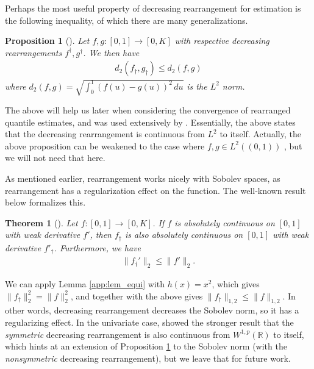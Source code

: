 \documentclass[11pt,a4paper]{article}
\newtheorem{thm}{Theorem}
\newtheorem{prop}{Proposition}
\newcommand{\R}{\mathbb{R}}
\begin{document}
\begin{appendices}
Perhaps the most useful property of decreasing rearrangement for estimation is the following inequality, of which there are many generalizations.
\begin{prop}[{\cite[Theorem 4.19]{Leoni2017}}]\label{app:prop_L2}
Let $f,g: [0,1] \to [0,K]$ with respective decreasing rearrangements $f^{\dagger},g^{\dagger}$. We then have 
\begin{align*}
  d_2(f_{\dagger}, g_{\dagger}) \leq d_2(f,g)
\end{align*}
where $d_2(f,g) = \sqrt{\int_0^1 (f(u) - g(u))^2\, du}$ is the $L^2$ norm.
\end{prop}
The above will help us later when considering the convergence of rearranged quantile estimates, and was used extensively by \citet{Chernozhukov2010}. Essentially, the above states that the decreasing rearrangement is continuous from $L^2$ to itself. Actually, the above proposition can be weakened to the case where $f,g \in L^2((0,1))$ \cite[Theorem 1.2.3]{Kesavan2006}, but we will not need that here.

As mentioned earlier, rearrangement works nicely with Sobolev spaces, as rearrangement has a regularization effect on the function. The well-known result below formalizes this.
\begin{thm}[{\cite[Theorem 4.22]{Leoni2017}}]\label{app:thm_sobolev}
Let $f:[0,1] \to [0,K]$. If $f$ is absolutely continuous on $[0,1]$ with weak derivative $f'$, then $f_{\dagger}$ is also absolutely continuous on $[0,1]$ with weak derivative $f'_{\dagger}$. Furthermore, we have
\begin{align*}
    \|f_{\dagger}'\|_{2} \leq \|f'\|_{2}.
\end{align*}
\end{thm}
We can apply {Lemma \ref{app:lem_equi}} with $h(x) = x^2$, which gives $\|f_{\dagger}\|_{2}^2= \|f\|_{2}^2$, and together with the above gives $\|f_{\dagger}\|_{1,2} \leq \|f\|_{1,2}$. In other words, 
decreasing rearrangement decreases the Sobolev norm, so it has a regularizing effect. In the univariate case, \cite{Coron1984} showed the stronger result that the \textit{symmetric} decreasing rearrangement is also continuous from $W^{1,p}(\R)$ to itself, which hints at an extension of {Proposition \ref{app:prop_L2}} to the Sobolev norm (with the \textit{nonsymmetric} decreasing rearrangement), but we leave that for future work.





\end{appendices}
\end{document}
